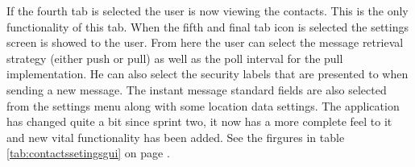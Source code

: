 \newpage

If the fourth tab is selected the user is now viewing the contacts. This is the only functionality of this tab. 
\newline
\newline
When the fifth and final tab icon is selected the settings screen is showed to the user. From here the user can select the message retrieval strategy (either push or pull) as well as the poll interval for the pull implementation. He can also select the security labels that are presented to when sending a new message. The instant message standard fields are also selected from the settings menu along with some location data settings.   
\newline
\newline
The application has changed quite a bit since sprint two, it now has a more complete feel to it and new vital functionality has been added. See the firgures in table \ref{tab:contactssetingsgui} on page \pageref{tab:contactssetingsgui}.
